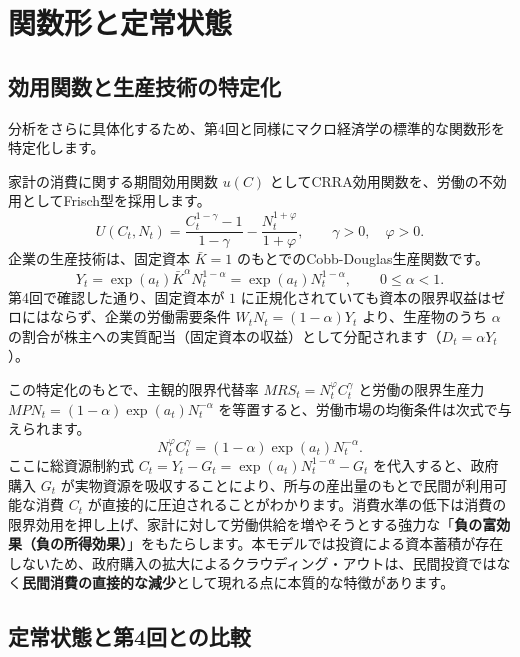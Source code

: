 \documentclass[
  japanese,
  lualatex,
  ja=standard,
  12pt,
  a4paper]{ltjsarticle}
\begin{document}
\section{関数形と定常状態}\label{ux95a2ux6570ux5f62ux3068ux5b9aux5e38ux72b6ux614b}

\subsection{効用関数と生産技術の特定化}\label{ux52b9ux7528ux95a2ux6570ux3068ux751fux7523ux6280ux8853ux306eux7279ux5b9aux5316}

分析をさらに具体化するため、第4回と同様にマクロ経済学の標準的な関数形を特定化します。

家計の消費に関する期間効用関数 \(u(C)\)
としてCRRA効用関数を、労働の不効用としてFrisch型を採用します。 \[
U(C_t, N_t) = \frac{C_t^{1-\gamma}-1}{1-\gamma} - \frac{N_t^{1+\varphi}}{1+\varphi}, \qquad \gamma > 0, \quad \varphi > 0.
\] 企業の生産技術は、固定資本 \(\bar{K}=1\)
のもとでのCobb-Douglas生産関数です。 \[
Y_t = \exp(a_t) \bar{K}^\alpha N_t^{1-\alpha} = \exp(a_t) N_t^{1-\alpha}, \qquad 0 \leq \alpha < 1.
\] 第4回で確認した通り、固定資本が \(1\)
に正規化されていても資本の限界収益はゼロにはならず、企業の労働需要条件
\(W_t N_t = (1-\alpha) Y_t\) より、生産物のうち \(\alpha\)
の割合が株主への実質配当（固定資本の収益）として分配されます（\(D_t = \alpha Y_t\)）。

この特定化のもとで、主観的限界代替率 \(MRS_t = N_t^\varphi C_t^\gamma\)
と労働の限界生産力 \(MPN_t = (1-\alpha)\exp(a_t)N_t^{-\alpha}\)
を等置すると、労働市場の均衡条件は次式で与えられます。 \[
N_t^\varphi C_t^\gamma = (1-\alpha) \exp(a_t) N_t^{-\alpha}.
\] ここに総資源制約式
\(C_t = Y_t - G_t = \exp(a_t) N_t^{1-\alpha} - G_t\)
を代入すると、政府購入 \(G_t\)
が実物資源を吸収することにより、所与の産出量のもとで民間が利用可能な消費
\(C_t\)
が直接的に圧迫されることがわかります。消費水準の低下は消費の限界効用を押し上げ、家計に対して労働供給を増やそうとする強力な「\textbf{負の富効果（負の所得効果）}」をもたらします。本モデルでは投資による資本蓄積が存在しないため、政府購入の拡大によるクラウディング・アウトは、民間投資ではなく\textbf{民間消費の直接的な減少}として現れる点に本質的な特徴があります。

\subsection{定常状態と第4回との比較}\label{ux5b9aux5e38ux72b6ux614bux3068ux7b2c4ux56deux3068ux306eux6bd4ux8f03}
\end{document}
